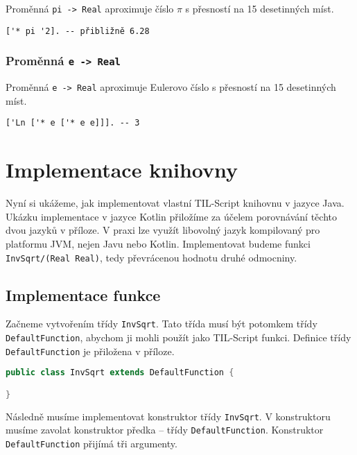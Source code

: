 Proměnná \lstinline{pi -> Real} aproximuje číslo $\pi$ s přesností na 15 desetinných míst.

\begin{lstlisting}[caption={Ukázka využití proměnné pi}]
['* pi '2]. -- přibližně 6.28
\end{lstlisting}

\subsubsection*{Proměnná \lstinline{e -> Real}}

Proměnná \lstinline{e -> Real} aproximuje Eulerovo číslo s přesností na 15 desetinných míst.

\begin{lstlisting}[caption={Ukázka využití proměnné e}]
['Ln ['* e ['* e e]]]. -- 3
\end{lstlisting}

\section{Implementace knihovny}

Nyní si ukážeme, jak implementovat vlastní TIL-Script knihovnu v jazyce Java. Ukázku implementace
v jazyce Kotlin přiložíme za účelem porovnávání těchto dvou jazyků v příloze. V praxi lze využít
libovolný jazyk kompilovaný pro platformu JVM, nejen Javu nebo Kotlin. Implementovat budeme funkci
\lstinline{InvSqrt/(Real Real)}, tedy převrácenou hodnotu druhé odmocniny.

\subsection{Implementace funkce}

Začneme vytvořením třídy \lstinline{InvSqrt}. Tato třída musí být potomkem třídy
\lstinline{DefaultFunction}, abychom ji mohli použít jako TIL-Script funkci. Definice třídy
\lstinline{DefaultFunction} je přiložena v příloze.

\begin{lstlisting}[caption={Třída InvSqrt}, language=Java]
public class InvSqrt extends DefaultFunction {

}
\end{lstlisting}

Následně musíme implementovat konstruktor třídy \lstinline{InvSqrt}. V konstruktoru musíme zavolat
konstruktor předka -- třídy \lstinline{DefaultFunction}. Konstruktor \lstinline{DefaultFunction}
přijímá tři argumenty.

